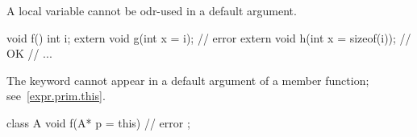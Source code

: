\pnum
\begin{note}
A local variable cannot be odr-used
in a default argument.
\end{note}
\begin{example}
\begin{codeblock}
void f() {
  int i;
  extern void g(int x = i);         // error
  extern void h(int x = sizeof(i)); // OK
  // ...
}
\end{codeblock}
\end{example}

\pnum
\begin{note}
The keyword
cannot appear in a default argument of a member function;
see~\ref{expr.prim.this}.
\begin{example}
\begin{codeblock}
class A {
  void f(A* p = this) { }           // error
};
\end{codeblock}
\end{example}
\end{note}

